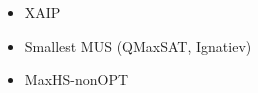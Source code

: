 
\begin{itemize}
    \item XAIP
    \item Smallest MUS (QMaxSAT, Ignatiev)
    \item MaxHS-nonOPT
\end{itemize}